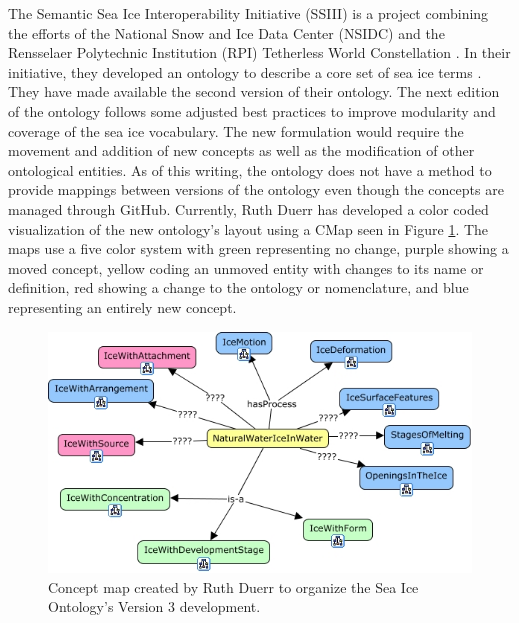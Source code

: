 The Semantic Sea Ice Interoperability Initiative (SSIII) is a project combining the efforts of the National Snow and Ice Data Center (NSIDC) and the Rensselaer Polytechnic Institution (RPI) Tetherless World Constellation \cite{SSIII}.
In their initiative, they developed an ontology to describe a core set of sea ice terms \cite{SSIIIOnto}.
They have made available the second version of their ontology.
The next edition of the ontology follows some adjusted best practices to improve modularity and coverage of the sea ice vocabulary.
The new formulation would require the movement and addition of new concepts as well as the modification of other ontological entities.
As of this writing, the ontology does not have a method to provide mappings between versions of the ontology even though the concepts are managed through GitHub.
Currently, Ruth Duerr has developed a color coded visualization of the new ontology's layout using a CMap seen in Figure \ref{WaterIce}.
The maps use a five color system with green representing no change, purple showing a moved concept, yellow coding an unmoved entity with changes to its name or definition, red showing a change to the ontology or nomenclature, and blue representing an entirely new concept.

\begin{figure}
	\centering
	\includegraphics[scale=1]{figures/NaturalIceinWater.png}
	\caption{Concept map created by Ruth Duerr to organize the Sea Ice Ontology's Version 3 development.}
	\label{WaterIce}
\end{figure}

